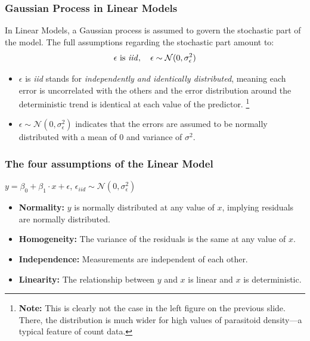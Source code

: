 \documentclass{beamer}
\begin{document}
\begin{frame}
    \frametitle{Gaussian Process in Linear Models}
    In Linear Models, a Gaussian process is assumed to govern the stochastic part of the model. The full assumptions regarding the stochastic part amount to:
    \begin{equation*}
        \epsilon \text{ is \textit{iid}}, \quad \epsilon \sim \mathcal{N}(0, \sigma^2_{\epsilon})
    \end{equation*}
    \begin{itemize}
        \item $\epsilon$ is \textit{iid} stands for \textit{independently and identically distributed}, meaning each error is uncorrelated with the others and the error distribution around the deterministic trend is identical at each value of the predictor. \footnote{\textbf{Note:} This is clearly not the case in the left figure on the previous slide. There, the distribution is much wider for high values of parasitoid density—a typical feature of count data.} 
        \item $\epsilon \sim \mathcal{N}(0, \sigma^2_{\epsilon})$ indicates that the errors are assumed to be normally distributed with a mean of 0 and variance of $\sigma^2$. 
    \end{itemize}
\end{frame}

\begin{frame}
    \frametitle{The four assumptions of the Linear Model}
    $y = \beta_0 + \beta_1 \cdot x + \epsilon$, $\epsilon_{iid} \sim \mathcal{N}(0, \sigma^2_{\epsilon})$ \\
    \vspace{0.5cm}
    \pause
    
    \begin{itemize}
        \item \textbf{Normality:} $y$ is normally distributed at any value of $x$, implying residuals are normally distributed.
        \item \textbf{Homogeneity:} The variance of the residuals is the same at any value of $x$.
        \item \textbf{Independence:} Measurements are independent of each other.
        \item \textbf{Linearity:} The relationship between $y$ and $x$ is linear and $x$ is deterministic.
    \end{itemize}
    
\end{frame}
\end{document}
